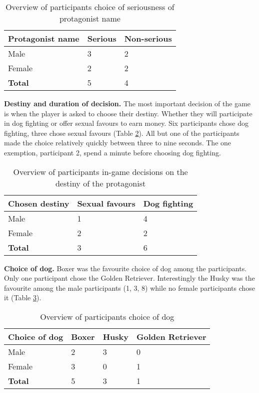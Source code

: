 \begin{table}[h]
\centering
\begin{tabular}{l l l}
\hline
\textbf{Protagonist name} & Serious & Non-serious \\
\hline
Male & 3 & 2 \\
Female & 2 & 2 \\
\textbf{Total} & 5 & 4 \\
\hline
\end{tabular}
\caption{\label{tab:name}Overview of participants choice of seriousness of protagonist name}
\end{table}


\textbf{Destiny and duration of decision.} The most important decision of the game is when the player is asked to choose their destiny. Whether they will participate in dog fighting or offer sexual favours to earn money. Six participants chose dog fighting, three chose sexual favours (Table \ref{tab:dest}). All but one of the participants made the choice relatively quickly between three to nine seconds. The one exemption, participant 2, spend a minute before choosing dog fighting.

\begin{table}[h]
\centering
\begin{tabular}{l l l}
\hline
\textbf{Chosen destiny} & Sexual favours & Dog fighting \\
\hline
Male & 1 & 4 \\
Female & 2 & 2 \\
\textbf{Total} & 3 & 6 \\
\hline
\end{tabular}
\caption{\label{tab:dest}Overview of participants in-game decisions on the destiny of the protagonist}
\end{table}


\textbf{Choice of dog.} Boxer was the favourite choice of dog among the participants. Only one participant chose the Golden Retriever. Interestingly the Husky was the favourite among the male participants (1, 3, 8) while no female participants chose it (Table \ref{tab:dog}).

\begin{table}[h]
\centering
\begin{tabular}{l l l l}
\hline
\textbf{Choice of dog} & Boxer & Husky & Golden Retriever \\
\hline
Male & 2 & 3 & 0 \\
Female & 3 & 0 & 1 \\
\textbf{Total} & 5 & 3 & 1 \\
\hline
\end{tabular}
\caption{\label{tab:dog}Overview of participants choice of dog}
\end{table}


